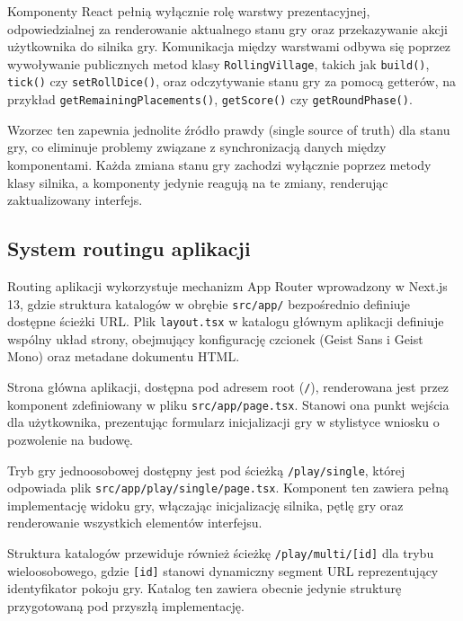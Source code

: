 \documentclass[12pt, a4paper]{article}
\begin{document}
Komponenty React pełnią wyłącznie rolę warstwy prezentacyjnej, odpowiedzialnej za renderowanie aktualnego stanu gry oraz przekazywanie akcji użytkownika do silnika gry. Komunikacja między warstwami odbywa się poprzez wywoływanie publicznych metod klasy \texttt{RollingVillage}, takich jak \texttt{build()}, \texttt{tick()} czy \texttt{setRollDice()}, oraz odczytywanie stanu gry za pomocą getterów, na przykład \texttt{getRemainingPlacements()}, \texttt{getScore()} czy \texttt{getRoundPhase()}.

Wzorzec ten zapewnia jednolite źródło prawdy (single source of truth) dla stanu gry, co eliminuje problemy związane z synchronizacją danych między komponentami. Każda zmiana stanu gry zachodzi wyłącznie poprzez metody klasy silnika, a komponenty jedynie reagują na te zmiany, renderując zaktualizowany interfejs.

\subsection{System routingu aplikacji}

Routing aplikacji wykorzystuje mechanizm App Router wprowadzony w Next.js 13, gdzie struktura katalogów w obrębie \texttt{src/app/} bezpośrednio definiuje dostępne ścieżki URL. Plik \texttt{layout.tsx} w katalogu głównym aplikacji definiuje wspólny układ strony, obejmujący konfigurację czcionek (Geist Sans i Geist Mono) oraz metadane dokumentu HTML.

Strona główna aplikacji, dostępna pod adresem root (\texttt{/}), renderowana jest przez komponent zdefiniowany w pliku \texttt{src/app/page.tsx}. Stanowi ona punkt wejścia dla użytkownika, prezentując formularz inicjalizacji gry w stylistyce wniosku o pozwolenie na budowę.

Tryb gry jednoosobowej dostępny jest pod ścieżką \texttt{/play/single}, której odpowiada plik \texttt{src/app/play/single/page.tsx}. Komponent ten zawiera pełną implementację widoku gry, włączając inicjalizację silnika, pętlę gry oraz renderowanie wszystkich elementów interfejsu.

Struktura katalogów przewiduje również ścieżkę \texttt{/play/multi/[id]} dla trybu wieloosobowego, gdzie \texttt{[id]} stanowi dynamiczny segment URL reprezentujący identyfikator pokoju gry. Katalog ten zawiera obecnie jedynie strukturę przygotowaną pod przyszłą implementację.

\end{document}
